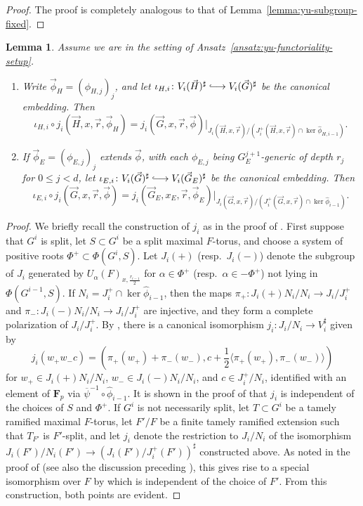 \documentclass[reqno]{amsart}
\numberwithin{equation}{subsection}
\newcommand{\F}{\mathbf{F}}
\newcommand{\ol}[1]{\overline{#1}}
\newcommand{\wh}[1]{\widehat{#1}}
\newcommand{\co}{\colon}
\newtheorem{lemma}[thm]{Lemma}
\theoremstyle{remark}
\numberwithin{equation}{subsection}
\numberwithin{figure}{subsection}
\begin{document}
\begin{proof}
The proof is completely analogous to that of Lemma~\ref{lemma:yu-subgroup-fixed}.
\end{proof}

\begin{lemma}\label{lemma:yu-special-iso-functoriality}
Assume we are in the setting of Ansatz~\ref{ansatz:yu-functoriality-setup}.
\begin{enumerate}
\item Write $\vec\phi_H=(\phi_{H,j})_j$, and let $\iota_{H,i}\colon V_i(\vec H)^\sharp\lhook\joinrel\longrightarrow V_i(\vec G)^\sharp$ be the canonical embedding. Then
\[
\iota_{H,i}\circ j_i(\vec H,x,\vec r,\vec\phi_H)
=j_i(\vec G,x,\vec r,\vec\phi)\big|_{J_i(\vec H,x,\vec r)/(J_i^+(\vec H,x,\vec r)\cap\ker\widehat\phi_{H,i-1})}.
\]
\item If $\vec\phi_E=(\phi_{E,j})_j$ extends $\vec\phi$, with each $\phi_{E,j}$ being $G_E^{j+1}$-generic of depth $r_j$ for $0\leq j<d$, let $\iota_{E,i}\colon V_i(\vec G)^\sharp\lhook\joinrel\longrightarrow V_i(\vec G_E)^\sharp$ be the canonical embedding. Then
\[
\iota_{E,i}\circ j_i(\vec G,x,\vec r,\vec\phi)
=j_i(\vec G_E,x_E,\vec r,\vec\phi_E)\big|_{J_i(\vec G,x,\vec r)/(J_i^+(\vec G,x,\vec r)\cap\ker\widehat\phi_{i-1})}.
\]
\end{enumerate}
\end{lemma}

\begin{proof}
We briefly recall the construction of $j_i$ as in the proof of \cite[Proposition 11.4]{Yu01}. First suppose that $G^i$ is split, let $S \subset G^i$ be a split maximal $F$-torus, and choose a system of positive roots $\Phi^+ \subset \Phi(G^i, S)$. Let $J_i(+)$ (resp.\ $J_i(-)$) denote the subgroup of $J_i$ generated by $U_\alpha(F)_{x,\frac{r_{i-1}}{2}}$ for $\alpha \in \Phi^+$ (resp.\ $\alpha \in -\Phi^+$) not lying in $\Phi(G^{i-1},S)$. If $N_i = J_i^+ \cap \ker\wh\phi_{i-1}$, then the maps $\pi_+\co J_i(+)N_i/N_i \to J_i/J_i^+$ and $\pi_-\co J_i(-)N_i/N_i \to J_i/J_i^+$ are injective, and they form a complete polarization of $J_i/J_i^+$. By \cite[Lemma 10.1]{Yu01}, there is a canonical isomorphism $j_i\co J_i/N_i \to V_i^\sharp$ given by
\[
j_i(w_+w_-c) = (\pi_+(w_+)+\pi_-(w_-), c + \frac{1}{2}\langle\pi_+(w_+), \pi_-(w_-)\rangle)
\]
for $w_+ \in J_i(+)N_i/N_i$, $w_- \in J_i(-)N_i/N_i$, and $c \in J_i^+/N_i$, identified with an element of $\F_p$ via $\ol\psi^{-1}\circ\wh\phi_{i-1}$. It is shown in the proof of \cite[Proposition 11.4]{Yu01} that $j_i$ is independent of the choices of $S$ and $\Phi^+$. If $G^i$ is not necessarily split, let $T \subset G^i$ be a tamely ramified maximal $F$-torus, let $F'/F$ be a finite tamely ramified extension such that $T_{F'}$ is $F'$-split, and let $j_i$ denote the restriction to $J_i/N_i$ of the isomorphism $J_i(F')/N_i(F') \to (J_i(F')/J_i^+(F'))^\sharp$ constructed above. As noted in the proof of \cite[Proposition 11.4]{Yu01} (see also the discussion preceding \cite[Definition 3.15]{HM08}), this gives rise to a special isomorphism over $F$ by \cite[Lemma 10.3]{Yu01} which is independent of the choice of $F'$. From this construction, both points are evident.
\end{proof}
\end{document}
